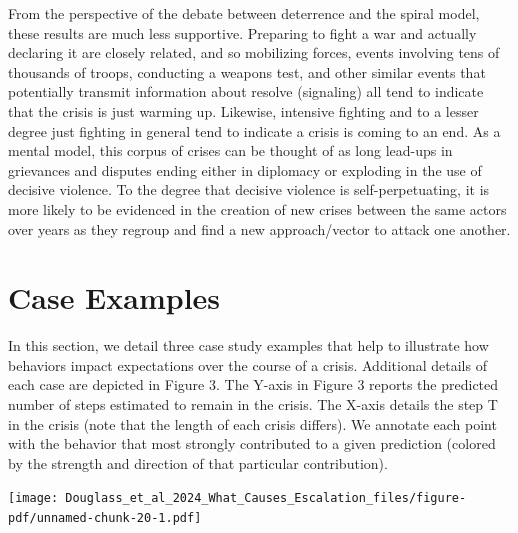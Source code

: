 \documentclass[
]{article}
\begin{document}
From the perspective of the debate between deterrence and the spiral
model, these results are much less supportive. Preparing to fight a war
and actually declaring it are closely related, and so mobilizing forces,
events involving tens of thousands of troops, conducting a weapons test,
and other similar events that potentially transmit information about
resolve (signaling) all tend to indicate that the crisis is just warming
up. Likewise, intensive fighting and to a lesser degree just fighting in
general tend to indicate a crisis is coming to an end. As a mental
model, this corpus of crises can be thought of as long lead-ups in
grievances and disputes ending either in diplomacy or exploding in the
use of decisive violence. To the degree that decisive violence is
self-perpetuating, it is more likely to be evidenced in the creation of
new crises between the same actors over years as they regroup and find a
new approach/vector to attack one another.

\section{Case Examples}\label{case-examples}

In this section, we detail three case study examples that help to
illustrate how behaviors impact expectations over the course of a
crisis. Additional details of each case are depicted in Figure 3. The
Y-axis in Figure 3 reports the predicted number of steps estimated to
remain in the crisis. The X-axis details the step T in the crisis (note
that the length of each crisis differs). We annotate each point with the
behavior that most strongly contributed to a given prediction (colored
by the strength and direction of that particular contribution).

\texttt{[image: Douglass\_et\_al\_2024\_What\_Causes\_Escalation\_files/figure-pdf/unnamed-chunk-20-1.pdf]}
\end{document}
